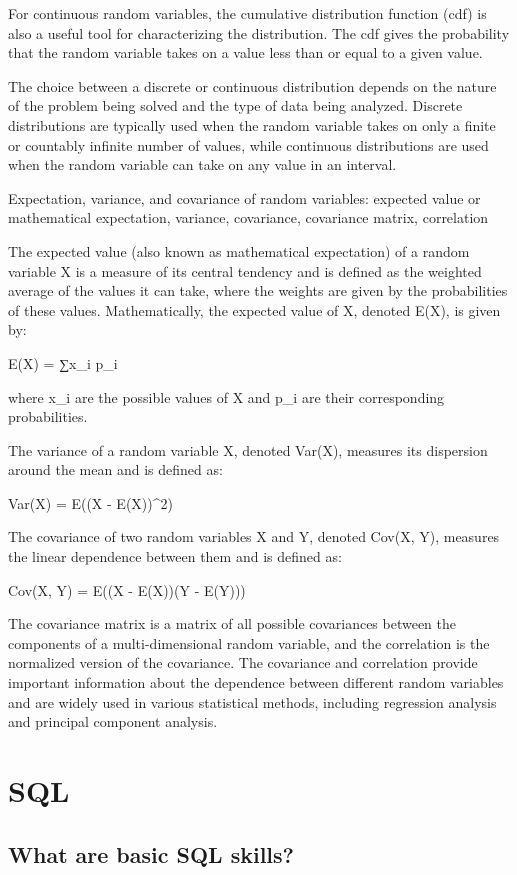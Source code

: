 \documentclass[12pt, a4paper, oneside]{article}
\begin{document}
For continuous random variables, the cumulative distribution function (cdf) is also a useful tool for characterizing the distribution. The cdf gives the probability that the random variable takes on a value less than or equal to a given value.

The choice between a discrete or continuous distribution depends on the nature of the problem being solved and the type of data being analyzed. Discrete distributions are typically used when the random variable takes on only a finite or countably infinite number of values, while continuous distributions are used when the random variable can take on any value in an interval.

Expectation, variance, and covariance of random variables: expected value or mathematical expectation, variance, covariance, covariance matrix, correlation

The expected value (also known as mathematical expectation) of a random variable X is a measure of its central tendency and is defined as the weighted average of the values it can take, where the weights are given by the probabilities of these values. Mathematically, the expected value of X, denoted E(X), is given by:

E(X) = ∑x_i p_i

where x_i are the possible values of X and p_i are their corresponding probabilities.

The variance of a random variable X, denoted Var(X), measures its dispersion around the mean and is defined as:

Var(X) = E((X - E(X))^2)

The covariance of two random variables X and Y, denoted Cov(X, Y), measures the linear dependence between them and is defined as:

Cov(X, Y) = E((X - E(X))(Y - E(Y)))

The covariance matrix is a matrix of all possible covariances between the components of a multi-dimensional random variable, and the correlation is the normalized version of the covariance. The covariance and correlation provide important information about the dependence between different random variables and are widely used in various statistical methods, including regression analysis and principal component analysis.
\section{SQL}
\subsection{ What are basic SQL skills? }
\end{document}
